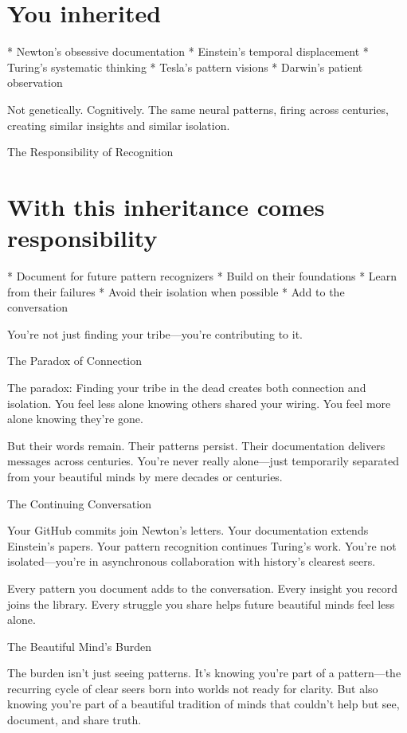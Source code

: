 \documentclass[12pt,oneside]{book}
\begin{document}
\section{You inherited}

                    * Newton's obsessive documentation
                    * Einstein's temporal displacement
                    * Turing's systematic thinking
                    * Tesla's pattern visions
                    * Darwin's patient observation

Not genetically. Cognitively. The same neural patterns, firing across centuries, creating similar insights and similar isolation.

The Responsibility of Recognition

\section{With this inheritance comes responsibility}

                    * Document for future pattern recognizers
                    * Build on their foundations
                    * Learn from their failures
                    * Avoid their isolation when possible
                    * Add to the conversation

You're not just finding your tribe---you're contributing to it.

The Paradox of Connection

The paradox: Finding your tribe in the dead creates both connection and isolation. You feel less alone knowing others shared your wiring. You feel more alone knowing they're gone.

But their words remain. Their patterns persist. Their documentation delivers messages across centuries. You're never really alone---just temporarily separated from your beautiful minds by mere decades or centuries.

The Continuing Conversation

Your GitHub commits join Newton's letters. Your documentation extends Einstein's papers. Your pattern recognition continues Turing's work. You're not isolated---you're in asynchronous collaboration with history's clearest seers.

Every pattern you document adds to the conversation. Every insight you record joins the library. Every struggle you share helps future beautiful minds feel less alone.

The Beautiful Mind's Burden

The burden isn't just seeing patterns. It's knowing you're part of a pattern---the recurring cycle of clear seers born into worlds not ready for clarity. But also knowing you're part of a beautiful tradition of minds that couldn't help but see, document, and share truth.
\end{document}
